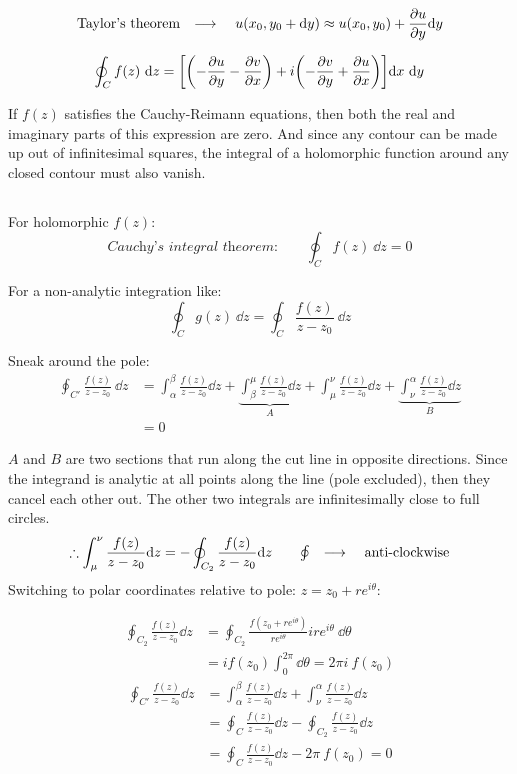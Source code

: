 \documentclass[10pt, a4paper, twocolumn]{article}
\newcommand{\arr}{\ensuremath{\longrightarrow\ }}
\begin{document}
\[\text{Taylor's theorem}\qq{\arr}
u(x_0,y_0+\dd y)
\approx u(x_0,y_0)+\pdv{u}{y}\dd y\]

\[\oint_Cf(z)\ \dd z
=\bqty{\pqty{-\pdv{u}{y}-\pdv{v}{x}}
+i\pqty{-\pdv{v}{y}+\pdv{u}{x}}}
\dd x\ \dd y\]

If $f(z)$ satisfies the Cauchy-Reimann equations, then both the real and imaginary parts of this expression are zero. And since any contour can be made up out of infinitesimal squares, the integral of a holomorphic function around any closed contour must also vanish.

\subsection{}
For holomorphic $f(z)$:
\[\textit{Cauchy's integral theorem:}\qquad
\oint_Cf(z)\ \dd z=0\]

For a non-analytic integration like:
\[\oint_Cg(z)\ \dd z
=\oint _C\frac{f(z)}{z-z_0}\ \dd z\]

Sneak around the pole:
\begin{equation*}
\begin{aligned}
\oint _{C'}\frac{f(z)}{z-z_0}\ \dd z
&=\int_\alpha ^\beta\frac{f(z)}{z-z_0}\dd z
+\underbrace{
\int_\beta ^\mu\frac{f(z)}{z-z_0}\dd z
}_A
+\int_\mu ^\nu\frac{f(z)}{z-z_0}\dd z
+\underbrace{
\int_\nu ^\alpha \frac{f(z)}{z-z_0}\dd z
}_B
\\&=0
\end{aligned}
\end{equation*}

$A$ and $B$ are two sections that run along the cut line in opposite directions. Since the integrand is analytic at all points along the line (pole excluded), then they cancel each other out. The other two integrals are infinitesimally close to full circles.
\[\therefore
\int_\mu^\nu\frac{f(z)}{z-z_0}\dd z
=-\oint_{C_2}\frac{f(z)}{z-z_0}\dd z
\qquad \textstyle{\oint} \qq{\arr}\text{anti-clockwise}
\]
Switching to polar coordinates relative to pole:
$z=z_0+re^{i\theta}$:

\begin{equation*}
\begin{aligned}
\oint_{C_2}\frac{f(z)}{z-z_0}\dd z
&=\oint_{C_2}\frac{f(z_0+re^{i\theta})}{re^{i\theta}}
ire^{i\theta}\ \dd \theta
\\&=if(z_0)
\int_0^{2\pi}\dd \theta=2\pi i\ f(z_0)
\end{aligned}
\end{equation*}
\begin{equation*}
\begin{aligned}
\oint_{C'}\frac{f(z)}{z-z_0}\dd z
&=\int_\alpha^\beta\frac{f(z)}{z-z_0}\dd z
+\int_\nu^\alpha\frac{f(z)}{z-z_0}\dd z
\\&=\oint_C\frac{f(z)}{z-z_0}\dd z
-\oint_{C_2}\frac{f(z)}{z-z_0}\dd z
\\&=\oint_C\frac{f(z)}{z-z_0}\dd z-2\pi\ f(z_0)=0
\end{aligned}
\end{equation*}
\end{document}
